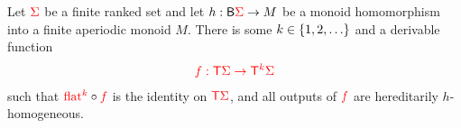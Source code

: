\begin{lemma}
    Let ${\color{red}{\Sigma}}$ be a finite ranked set and let $h : \mathsf{B} {\color{red}{\Sigma}} \to M$ be a monoid homomorphism into a finite aperiodic monoid $M$. There is some $k \in \{1,2,\ldots\}$ and a derivable function
    \begin{align*}
        {\color{red}{f : {\color{red}{\mathsf T}}{\color{red}{\Sigma}}\to {\color{red}{\mathsf T}}^k {\color{red}{\Sigma}}}}  
    \end{align*}
such that ${\color{red}{\mathrm{flat}}}^{{\color{red}{k}}} \circ {\color{red}{f}}$ is the identity on ${\color{red}{\mathsf T}} {\color{red}{\Sigma}}$, and  all outputs of  ${\color{red}{f}}$ are hereditarily $h$-homogeneous.
\end{lemma}

